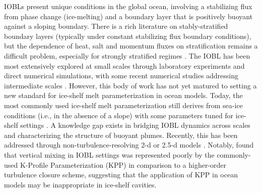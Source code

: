 \documentclass[draft]{styles/agujournal2019}
\begin{document}
IOBLs present unique conditions in the global ocean, involving a stabilizing flux from phase change (ice-melting) and a boundary layer that is positively buoyant against a sloping boundary. There is a rich literature on stably-stratified boundary layers (typically under constant stabilizing flux boundary conditions), but the dependence of heat, salt and momentum fluxes on stratification remains a difficult problem, especially for strongly stratified regimes \cite{zonta_stably_2018}. The IOBL has been most extensively explored at small scales through laboratory experiments and direct numerical simulations, with some recent numerical studies addressing intermediate scales \cite{mondal_ablation_2019, vreugdenhil_stratification_2019, middleton_numerical_2021}. However, this body of work has not yet matured to setting a new standard for ice-shelf melt parameterization in ocean models. Today, the most commonly used ice-shelf melt parameterization still derives from sea-ice conditions (i.e., in the absence of a slope) with some parameters tuned for ice-shelf settings \cite{holland_modeling_1999, jenkins_observation_2010, mcphee_dynamics_1987}. A knowledge gap exists in bridging IOBL dynamics across scales and characterizing the structure of buoyant plumes. Recently, this has been addressed through non-turbulence-resolving 2-d or 2.5-d models \cite{jenkins_simple_2016, jenkins_shear_2021, cheng_modeling_2020}. Notably,  found that vertical mixing in IOBL settings was represented poorly by the commonly-used K-Profile Parameterization (KPP) in comparison to a higher-order turbulence closure scheme, suggesting that the application of KPP in ocean models may be inappropriate in ice-shelf cavities. 
\end{document}
